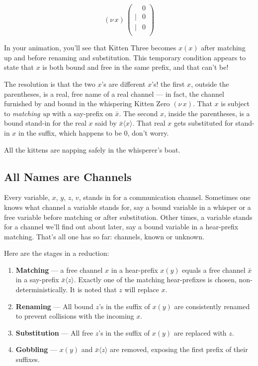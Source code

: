 \documentclass[10pt,oneside,x11names]{article}
\newcommand\napping    [0]{0}
\newcommand\whispering [2]{(\nu\,#1)\,{#2}}
\theoremstyle{definition}
\theoremstyle{warning}
\begin{document}
\begin{equation}
\whispering{x}{\left(
\begin{array}{clll}
 {}     & \napping   \\
 \vert  & {\napping} \\
 \vert  & {\napping} \\
\end{array}\right)}
\end{equation}

In your animation, you'll see that Kitten Three becomes \(x(x)\)
after matching up and before renaming and substitution. This
temporary condition appears to state that \(x\) is both bound
and free in the same prefix, and that can't be!

The resolution is that the two \(x\)'s are different \(x\)'s! the
first \(x\), outside the parentheses, is a real, free name of a
real channel --- in fact, the channel furnished by and bound
in the whispering Kitten Zero \((\nu\,x)\). That \(x\) is subject
to \emph{matching up} with a say-prefix on \(\bar{x}\). The second
\(x\), inside the parentheses, is a bound stand-in for the real
\(x\) said by  \(\bar{x}\langle{x}\rangle\). That real \(x\) gets
substituted for stand-in \(x\) in the suffix, which happens to
be \(0\), don't worry.

All the kittens are napping safely in the whisperer's boat.

\subsection{All Names are Channels}
\label{sec:org862747f}

Every variable, \(x\), \(y\), \(z\), \(v\), stands in for a
communication channel. Sometimes one knows what channel a
variable stands for, say a bound variable in a whisper or a
free variable before matching or after substitution. Other
times, a variable stands for a channel we'll find out about
later, say a bound variable in a hear-prefix matching. That's
all one has so far: channels, known or unknown.

Here are the stages in a reduction:

\begin{enumerate}
\item \textbf{Matching} --- a free channel \(x\) in a hear-prefix
\(x(y)\) equals a free channel \(\bar{x}\) in a say-prefix
\(\bar{x}\langle{z}\rangle\). Exactly one of the matching
hear-prefixes is chosen, non-deterministically. It is noted
that \(z\) will replace \(x\).

\item \textbf{Renaming} --- All bound \(z\)'s in the suffix of
\(x(y)\) are consistently renamed to prevent collisions with
the incoming \(x\).

\item \textbf{Substitution} --- All free \(z\)'s in the suffix of
\(x(y)\) are replaced with \(z\).

\item \textbf{Gobbling} --- \(x(y)\) and \(\bar{x}\langle{z}\rangle\)
are removed, exposing the first prefix of their suffixes.
\end{enumerate}
\end{document}
